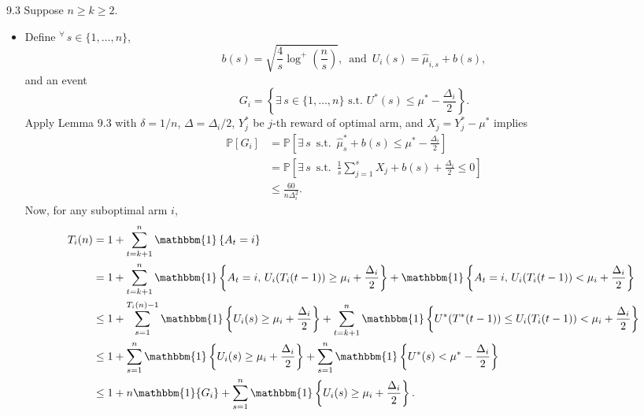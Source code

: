 \documentclass[10pt]{article}
\theoremstyle{definition}
\newenvironment{solution*}[1]{%
  \IfBlankTF{#1}
    {\renewcommand{\themanualsolutioninner}{\unskip}}
    {\renewcommand\themanualsolutioninner{#1}}%
  \manualsolutioninner
}{\endmanualsolutioninner}
\begin{document}
\begin{solution*}{9.3}
    Suppose $n \geq k \geq 2$.
    \begin{itemize}
        \item[(a)] Define $^\forall \, s \in \{1,\ldots,n\}$,
        \begin{equation*}
            b(s) = \sqrt{\frac{4}{s} \log^+ \left(\frac{n}{s}\right)}, \, \text{ and } \, U_i (s) = \hat{\mu}_{i,s} + b(s),
        \end{equation*}
        and an event
        \begin{equation*}
            G_i = \left\{ \exists \, s \in \{1, \ldots, n\} \text{ s.t. } U^* (s) \leq \mu^* - \frac{\Delta_i}{2} \right\}.
        \end{equation*}
        Apply Lemma 9.3 with $\delta = 1/n$, $\Delta = \Delta_i /2$, $Y_j^*$ be $j$-th reward of optimal arm, and $X_j = Y_j^* - \mu^*$ implies
        \begin{align*}
            \mathbb{P}\left[G_i\right]
            &= \mathbb{P}\left[ \exists \, s \, \text{ s.t. } \, \hat{\mu}_s^* + b(s) \leq \mu^* - \frac{\Delta_i}{2} \right] \\
            &= \mathbb{P}\left[ \exists \, s \, \text{ s.t. } \, \frac{1}{s} \sum_{j=1}^s X_j + b(s) + \frac{\Delta_i}{2} \leq 0 \right]\\
            &\leq \frac{60}{n \Delta_i^2}.
        \end{align*}
        Now, for any suboptimal arm $i$,
        \begin{align*}
            T_i (n) &= 1 + \sum_{t=k+1}^n \mathbbm{1}\left\{A_t = i\right\} \\
            &= 1 + \sum_{t=k+1}^n \mathbbm{1}\left\{A_t = i, \, U_i (T_i (t-1)) \geq \mu_i + \frac{\Delta_i}{2}\right\} + \mathbbm{1}\left\{A_t = i, \, U_i (T_i (t-1))<\mu_i + \frac{\Delta_i}{2}\right\} \\
            &\leq 1 + \sum_{s=1}^{T_i(n)-1} \mathbbm{1}\left\{U_i (s) \geq \mu_i + \frac{\Delta_i}{2}\right\} + \sum_{t=k+1}^n \mathbbm{1}\left\{U^* (T^* (t-1)) \leq U_i (T_i (t-1)) < \mu_i + \frac{\Delta_i}{2}\right\} \\
            &\leq 1 + \sum_{s=1}^n \mathbbm{1}\left\{U_i(s) \geq \mu_i + \frac{\Delta_i}{2}\right\} + \sum_{s=1}^n \mathbbm{1}\left\{U^* (s) < \mu^* - \frac{\Delta_i}{2}\right\} \\
            &\leq 1 + n \mathbbm{1}\{G_i\} + \sum_{s=1}^n \mathbbm{1}\left\{U_i (s) \geq \mu_i + \frac{\Delta_i}{2}\right\}.
        \end{align*}

\end{itemize}
\end{solution*}
\end{document}

